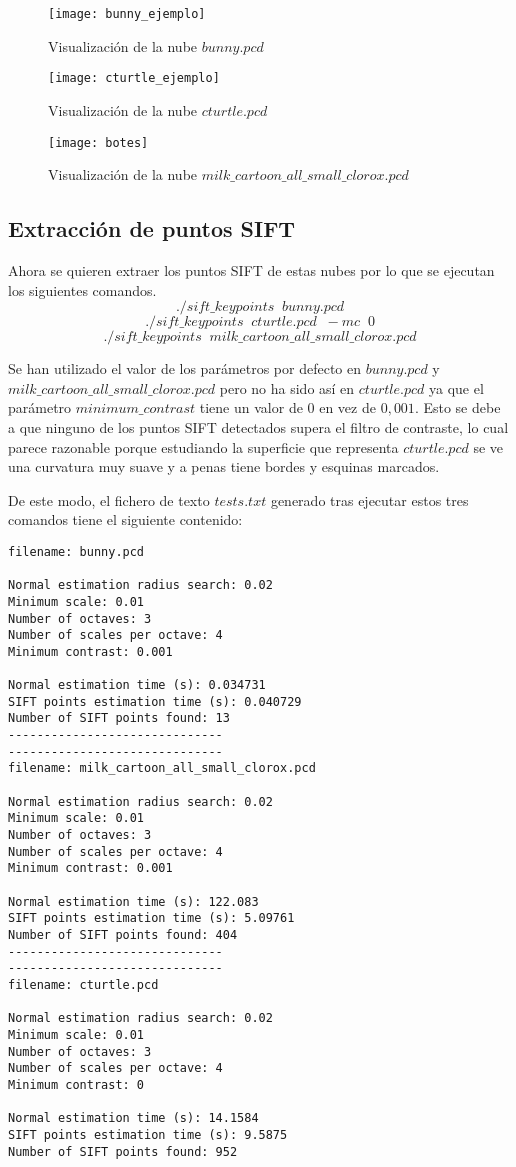 \begin{figure}[!htb]
  \texttt{[image: bunny\_ejemplo]}
  \caption{Visualización de la nube $bunny.pcd$}\label{fig:bunny_ejemplo}
\endminipage\hfill
{}
  \texttt{[image: cturtle\_ejemplo]}
  \caption{Visualización de la nube $cturtle.pcd$}\label{fig:cturtle_ejemplo}
\endminipage\hfill
{}
  \texttt{[image: botes]}
  \caption{Visualización de la nube $milk\_cartoon\_all\_small\_clorox.pcd$}\label{fig:botes}
\endminipage\hfill
\end{figure}

\subsection{Extracción de puntos SIFT}
Ahora se quieren extraer los puntos SIFT de estas nubes por lo que se ejecutan los siguientes comandos.
$$./sift\_keypoints\;\;bunny.pcd$$
$$./sift\_keypoints\;\;cturtle.pcd\;\;-mc\;\;0$$
$$./sift\_keypoints\;\;milk\_cartoon\_all\_small\_clorox.pcd$$

Se han utilizado el valor de los parámetros por defecto en $bunny.pcd$ y 
$milk\_cartoon\_all\_small\_clorox.pcd$ pero no ha sido así en $cturtle.pcd$ ya que el parámetro $minimum\_contrast$ tiene un valor de $0$ en vez de $0,001$. Esto se debe a que ninguno de los puntos SIFT detectados supera el filtro de contraste, lo cual parece razonable porque estudiando la superficie que representa $cturtle.pcd$ se ve una curvatura muy suave y a penas tiene bordes y esquinas marcados.

De este modo, el fichero de texto $tests.txt$ generado tras ejecutar estos tres comandos tiene el siguiente contenido:

\begin{lstlisting}
filename: bunny.pcd

Normal estimation radius search: 0.02
Minimum scale: 0.01
Number of octaves: 3
Number of scales per octave: 4
Minimum contrast: 0.001

Normal estimation time (s): 0.034731
SIFT points estimation time (s): 0.040729
Number of SIFT points found: 13
------------------------------
------------------------------
filename: milk_cartoon_all_small_clorox.pcd

Normal estimation radius search: 0.02
Minimum scale: 0.01
Number of octaves: 3
Number of scales per octave: 4
Minimum contrast: 0.001

Normal estimation time (s): 122.083
SIFT points estimation time (s): 5.09761
Number of SIFT points found: 404
------------------------------
------------------------------
filename: cturtle.pcd

Normal estimation radius search: 0.02
Minimum scale: 0.01
Number of octaves: 3
Number of scales per octave: 4
Minimum contrast: 0

Normal estimation time (s): 14.1584
SIFT points estimation time (s): 9.5875
Number of SIFT points found: 952
\end{lstlisting}

